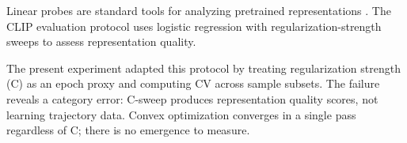 Linear probes are standard tools for analyzing pretrained representations \citep{alain2017understanding}. The CLIP evaluation protocol \citep{radford2021learning} uses logistic regression with regularization-strength sweeps to assess representation quality.

The present experiment adapted this protocol by treating regularization strength (C) as an epoch proxy and computing CV across sample subsets. The failure reveals a category error: C-sweep produces representation quality scores, not learning trajectory data. Convex optimization converges in a single pass regardless of C; there is no emergence to measure.

